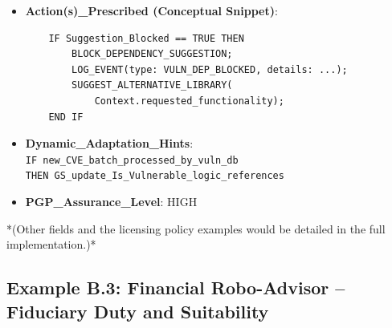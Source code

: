 \documentclass[sigconf,review,anonymous=false]{acmart} %
\begin{document}
\begin{itemize}
{    }
    \item \textbf{Action(s)\_Prescribed (Conceptual Snippet)}:
    {\scriptsize
    \begin{verbatim}
    IF Suggestion_Blocked == TRUE THEN
        BLOCK_DEPENDENCY_SUGGESTION;
        LOG_EVENT(type: VULN_DEP_BLOCKED, details: ...);
        SUGGEST_ALTERNATIVE_LIBRARY(
            Context.requested_functionality);
    END IF
    \end{verbatim}
    }
    \item \textbf{Dynamic\_Adaptation\_Hints}: \\
    \texttt{IF new\_CVE\_batch\_processed\_by\_vuln\_db} \\
    \texttt{THEN GS\_update\_Is\_Vulnerable\_logic\_references}
    \item \textbf{PGP\_Assurance\_Level}: HIGH
\end{itemize}
*(Other fields and the licensing policy examples would be detailed in the full implementation.)*

\subsection{Example B.3: Financial Robo-Advisor – Fiduciary Duty and Suitability}
\label{app:policy_example_finance}
\end{document}
